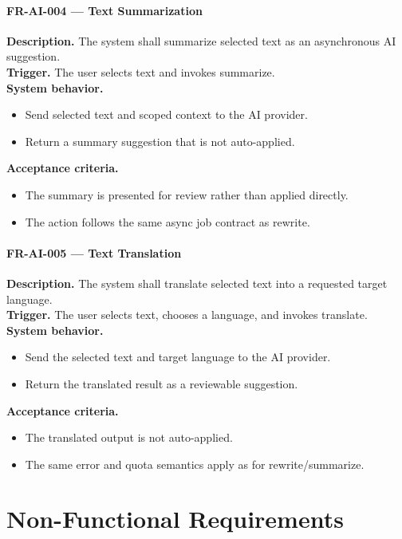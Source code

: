 \paragraph{FR-AI-004 --- Text Summarization}
\textbf{Description.} The system shall summarize selected text as an asynchronous AI suggestion.\\
\textbf{Trigger.} The user selects text and invokes summarize.\\
\textbf{System behavior.}
\begin{itemize}
  \item Send selected text and scoped context to the AI provider.
  \item Return a summary suggestion that is not auto-applied.
\end{itemize}
\textbf{Acceptance criteria.}
\begin{itemize}
  \item The summary is presented for review rather than applied directly.
  \item The action follows the same async job contract as rewrite.
\end{itemize}

\paragraph{FR-AI-005 --- Text Translation}
\textbf{Description.} The system shall translate selected text into a requested target language.\\
\textbf{Trigger.} The user selects text, chooses a language, and invokes translate.\\
\textbf{System behavior.}
\begin{itemize}
  \item Send the selected text and target language to the AI provider.
  \item Return the translated result as a reviewable suggestion.
\end{itemize}
\textbf{Acceptance criteria.}
\begin{itemize}
  \item The translated output is not auto-applied.
  \item The same error and quota semantics apply as for rewrite/summarize.
\end{itemize}

\section{Non-Functional Requirements}

